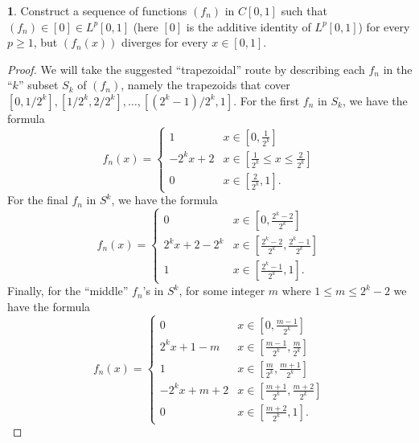 \documentclass[12pt]{article}
\theoremstyle{definition}
\newtheorem{ex}{}
\begin{document}
\begin{ex}
	Construct a sequence of functions $(f_n)$ in $C[0, 1]$ such that $(f_n) \in [0] \in L^p[0, 1]$ (here $[0]$ is the additive identity of $L^p[0,1]$) for every $p \geq 1$, but $(f_n(x))$ diverges for every $x \in [0, 1]$.
\end{ex}
\begin{proof}
	We will take the suggested ``trapezoidal'' route by describing each $f_n$ in the ``$k$'' subset $S_k$ of $(f_n)$, namely the trapezoids that cover $[0, 1/2^k], [1/2^k, 2/2^k], \dots, [(2^k-1)/2^k, 1]$.
	For the first $f_n$ in $S_k$, we have the formula \begin{equation*}
		f_n(x) = \begin{cases}
			1         & x \in \left[0, \frac{1}{2^k} \right]                        \\
			-2^kx + 2 & x \in \left[\frac{1}{2^k} \leq x \leq \frac{2}{2^k} \right] \\
			0         & x \in \left[\frac{2}{2^k}, 1 \right].
		\end{cases}
	\end{equation*}
	For the final $f_n$ in $S^k$, we have the formula \begin{equation*}
		f_n(x) = \begin{cases}
			0              & x \in \left[0, \frac{2^k-2}{2^k} \right]                      \\
			2^kx + 2 - 2^k & x \in \left[ \frac{2^k - 2}{2^k}, \frac{2^k - 1}{2^k} \right] \\
			1              & x \in \left[\frac{2^k-1}{2^k}, 1 \right].
		\end{cases}
	\end{equation*}
	Finally, for the ``middle'' $f_n$'s in $S^k$, for some integer $m$ where $1 \leq m \leq 2^k-2$ we have the formula \begin{equation*}
		f_n(x) = \begin{cases}
			0 & x \in \left[ 0, \frac{m-1}{2^k} \right]                  \\
			2^kx+1-m & x \in \left[ \frac{m-1}{2^k}, \frac{m }{2^k} \right]                                  \\
			1 & x \in \left[ \frac{m }{2^k}, \frac{m + 1}{2^k} \right] \\
			-2^kx+m+2 & x \in \left[ \frac{m+1}{2^k}, \frac{m+2}{2^k} \right]                                  \\
			0 & x \in \left[ \frac{m+2}{2^k}, 1 \right].
		\end{cases}
	\end{equation*}

\end{proof}
\end{document}
